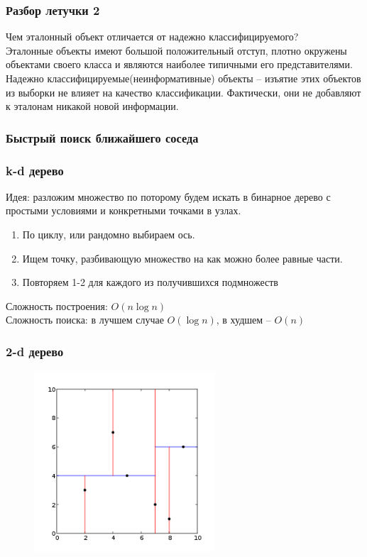 \documentclass[12pt]{beamer}
\begin{document}
\begin{frame}\frametitle{Разбор летучки 2}
Чем эталонный объект отличается от надежно классифицируемого?\\
\vspace{8mm}
Эталонные объекты имеют большой положительный отступ, плотно окружены
объектами своего класса и являются наиболее типичными его представителями.\\
\vspace{5mm}
Надежно классифицируемые(неинформативные) объекты -- изъятие
этих объектов из выборки не влияет на качество классификации. Фактически, они не добавляют к эталонам никакой новой информации. 

\end{frame}

\begin{frame}\frametitle{Быстрый поиск ближайшего соседа}
\end{frame}

\begin{frame}\frametitle{k-d дерево}
Идея: разложим множество по поторому будем искать
в бинарное дерево с простыми условиями и
конкретными точками в узлах.
\vspace{5mm}
\begin{enumerate}
\item По циклу, или рандомно выбираем ось.
\item Ищем точку, разбивающую множество на как
можно более равные части.
\item Повторяем 1-2 для каждого из получившихся подмножеств 
\end{enumerate}
Сложность построения: $O(n\log n)$\\
Сложность поиска: в лучшем
случае $O(\log n)$, в худшем -- $O(n)$
\end{frame}
\begin{frame}\frametitle{2-d дерево}

\begin{figure}[htbp]
\centering
\includegraphics[height=190pt]{Kdtree_2d}  
\end{figure}
\end{frame}
\end{document}
